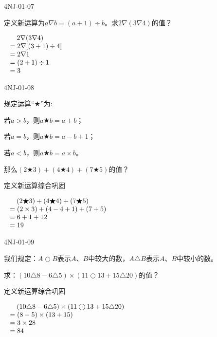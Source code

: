 \begin{defproblem}{4NJ-01-07}%
\begin{onlyproblem}%
定义新运算为$a\nabla b=(a+1)\div b$。求$2\nabla (3\nabla 4)$的值？
\end{onlyproblem}%
\begin{onlysolution}%
$\begin{array}[t]{r@{~}l}
&\quad 2\nabla (3\nabla 4)\\
&=2\nabla [(3+1)\div 4]\\
&=2\nabla 1\\
&=(2+1)\div 1\\
&=3
\end{array}
$
\end{onlysolution}%
\end{defproblem}




\begin{defproblem}{4NJ-01-08}%
\begin{onlyproblem}%
规定运算``$\bigstar$''为: 

若$a>b$，则$a\bigstar b=a+b$；

若$a=b$，则$a\bigstar b=a-b+1$；           

若$a<b$，则$a\bigstar b=a\times b$。

那么$(2\bigstar 3)+(4\bigstar 4)+(7\bigstar 5)$的值？ 

\end{onlyproblem}%
\begin{onlysolution}%
定义新运算综合巩固

$\begin{array}[t]{r@{~}l}
&\quad (2\bigstar 3)+(4\bigstar 4)+(7\bigstar 5)\\
&=(2\times3)+(4-4+1)+(7+5)\\
&=6+1+12\\
&=19\\
\end{array}
$
\end{onlysolution}%
\end{defproblem}



\begin{defproblem}{4NJ-01-09}%
\begin{onlyproblem}%
我们规定：$A\bigcirc B$表示$A$、$B$中较大的数，$A\triangle B$表示$A$、$B$中较小的数。

求：$(10\triangle 8-6\triangle 5)\times(11\bigcirc13+15\triangle 20)$的值？


\end{onlyproblem}%
\begin{onlysolution}%
定义新运算综合巩固

$\begin{array}[t]{r@{~}l}
&\quad (10\triangle 8-6\triangle 5)\times(11\bigcirc13+15\triangle 20)\\
&=(8-5)\times(13+15)\\
&=3\times28\\
&=84\\
\end{array}
$
\end{onlysolution}%
\end{defproblem}



